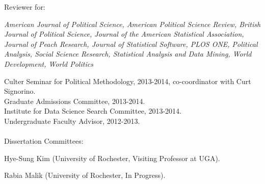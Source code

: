 \documentclass[margin,line]{res}
\newenvironment{list1}{
  \begin{list}{\ding{113}}{%
      \setlength{\itemsep}{0in}
      \setlength{\parsep}{0in} \setlength{\parskip}{0in}
      \setlength{\topsep}{0in} \setlength{\partopsep}{0in} 
      \setlength{\leftmargin}{0.83 cm}}}{\end{list}}
\begin{document}
\begin{resume}
Reviewer for:
\begin{list1}
\item[] \emph{American Journal of Political Science, American Political Science Review,  British Journal of Political Science, Journal of the American Statistical Association, Journal of Peach Research, Journal of Statistical Software, PLOS ONE, Political Analysis, Social Science Research,  Statistical Analysis and Data Mining, World Development, World Politics}
\end{list1}
Culter Seminar for Political Methodology, 2013-2014, co-coordinator with Curt Signorino. \\
Graduate Admissions Committee, 2013-2014.\\
Institute for Data Science Search Committee, 2013-2014.\\
Undergraduate Faculty Advisor, 2012-2013. \\ 
\\
Dissertation Committees:
\begin{list1}
\item[] Hye-Sung Kim (University of Rochester, Visiting Professor at UGA).
\item[] Rabia Malik (University of Rochester, In Progress).
\end{list1}



\end{resume}
\end{document}
